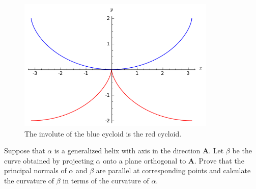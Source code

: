 \documentclass[Shifrin_Solutions_Spring_2018]{subfiles}
\begin{document}
\begin{figure}[h]
\centering
\includegraphics[height=2.5in]{picturebook/ch1sec2/ex1-2-17}
\caption{The involute of the blue cycloid is the red cycloid.}
\end{figure}



\clearpage


\begin{exercise}
Suppose that $\alpha$ is a generalized helix with axis in the direction $\mathbf{A}$. 
Let $\beta$ be the curve obtained by projecting $\alpha$ onto a plane orthogonal to 
$\mathbf{A}$. Prove that the principal normals of $\alpha$ and $\beta$ are parallel
at corresponding points and calculate the curvature of $\beta$ in terms of the 
curvature of $\alpha$.
\end{exercise}
\end{document}
